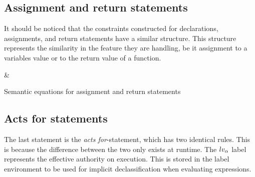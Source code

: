 \subsection{Assignment and return statements}
It should be noticed that the constraints constructed for declarations, assignments, and return statements have a similar structure.
This structure represents the similarity in the feature they are handling, be it assignment to a variables value or to the return value of a function.

\begin{table}[H]
\begin{semanticequations}
 \seSpace
& \seSpace
\end{semanticequations}
\caption{Semantic equations for assignment and return statements}
\label{cstr:assignment_return}
\end{table}

\subsection{Acts for statements}
The last statement is the \emph{acts for}-statement, which has two identical rules.
This is because the difference between the two only exists at runtime.
The $lv_\alpha$ label represents the effective authority on execution.
This is stored in the label environment to be used for implicit declassification when evaluating expressions.

